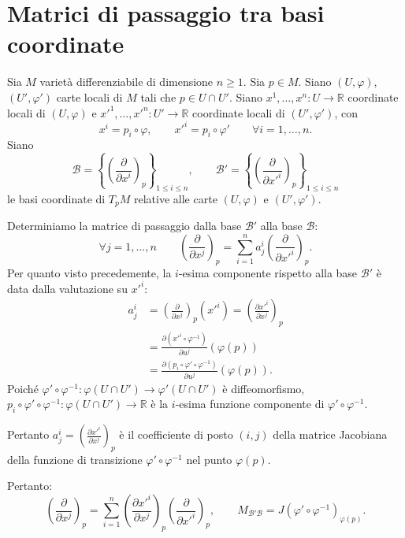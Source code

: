     \section{Matrici di passaggio tra basi coordinate}

        Sia $M$ varietà differenziabile di dimensione $n \geq 1$. Sia $p \in M$.
        Siano $(U, \varphi)$, $(U', \varphi')$ carte locali di $M$ tali che $p \in U \cap U'$.
        Siano $x^1, \dots, x^n : U \to \mathbb{R}$ coordinate locali di $(U, \varphi)$ e $x'^1, \dots, x'^n : U' \to \mathbb{R}$ coordinate locali di $(U', \varphi')$, con
        \[
        x^i = p_i \circ \varphi, \qquad x'^i = p_i \circ \varphi' \qquad \forall i = 1, \dots, n.
        \]
        Siano
        \[
        \mathcal{B} = \left\{ \left( \frac{\partial}{\partial x^i} \right)_p \right\}_{1 \leq i \leq n}, \qquad \mathcal{B}' = \left\{ \left( \frac{\partial}{\partial x'^i} \right)_p \right\}_{1 \leq i \leq n}
        \]
        le basi coordinate di $T_p M$ relative alle carte $(U, \varphi)$ e $(U', \varphi')$.

        Determiniamo la matrice di passaggio dalla base $\mathcal{B}'$ alla base $\mathcal{B}$:
        \[
        \forall j = 1, \dots, n \qquad \left( \frac{\partial}{\partial x^j} \right)_p = \sum_{i=1}^n a^i_j \left( \frac{\partial}{\partial x'^i} \right)_p.
        \]
        Per quanto visto precedemente, la $i$-esima componente rispetto alla base $\mathcal{B}'$ è data dalla valutazione su $x'^i$:
        \begin{align*}
        a^i_j &= \left( \frac{\partial}{\partial x^j} \right)_p (x'^i) = \left( \frac{\partial x'^i}{\partial x^j} \right)_p \\
        &= \frac{\partial (x'^i \circ \varphi^{-1})}{\partial u^j} (\varphi(p)) \\
        &= \frac{\partial (p_i \circ \varphi' \circ \varphi^{-1})}{\partial u^j} (\varphi(p)).
        \end{align*}
        Poiché $\varphi' \circ \varphi^{-1} : \varphi(U \cap U') \to \varphi'(U \cap U')$ è diffeomorfismo, $p_i \circ \varphi' \circ \varphi^{-1} : \varphi(U \cap U') \to \mathbb{R}$ è la $i$-esima funzione componente di $\varphi' \circ \varphi^{-1}$.

        Pertanto $a^i_j = \left( \frac{\partial x'^i}{\partial x^j} \right)_p$ è il coefficiente di posto $(i, j)$ della matrice Jacobiana della funzione di transizione $\varphi' \circ \varphi^{-1}$ nel punto $\varphi(p)$.

        Pertanto:
        \[
        \left( \frac{\partial}{\partial x^j} \right)_p = \sum_{i=1}^n \left( \frac{\partial x'^i}{\partial x^j} \right)_p \left( \frac{\partial}{\partial x'^i} \right)_p, \qquad M_{\mathcal{B}' \mathcal{B}} = J(\varphi' \circ \varphi^{-1})_{\varphi(p)}.
        \]


